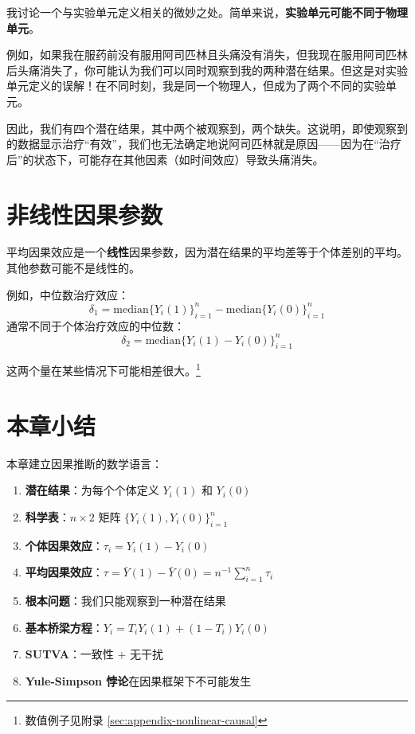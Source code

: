 我讨论一个与实验单元定义相关的微妙之处。简单来说，\textbf{实验单元可能不同于物理单元}。

例如，如果我在服药前没有服用阿司匹林且头痛没有消失，但我现在服用阿司匹林后头痛消失了，你可能认为我们可以同时观察到我的两种潜在结果。但这是对实验单元定义的误解！在不同时刻，我是同一个物理人，但成为了两个不同的实验单元。

因此，我们有四个潜在结果，其中两个被观察到，两个缺失。这说明，即使观察到的数据显示治疗``有效''，我们也无法确定地说阿司匹林就是原因——因为在``治疗后''的状态下，可能存在其他因素（如时间效应）导致头痛消失。

\section{非线性因果参数}

平均因果效应是一个\textbf{线性}因果参数，因为潜在结果的平均差等于个体差别的平均。其他参数可能不是线性的。

例如，中位数治疗效应：
\[
\delta_1 = \text{median}\{ Y_i(1) \}_{i=1}^n - \text{median}\{ Y_i(0) \}_{i=1}^n
\tag{2.6}\label{eq:median-treatment-effect-1}
\]
通常不同于个体治疗效应的中位数：
\[
\delta_2 = \text{median}\{ Y_i(1) - Y_i(0) \}_{i=1}^n
\tag{2.7}\label{eq:median-treatment-effect-2}
\]

这两个量在某些情况下可能相差很大。\footnote{数值例子见附录 \cref{sec:appendix-nonlinear-causal}}

\section{本章小结}

本章建立因果推断的数学语言：

\begin{enumerate}
  \item \textbf{潜在结果}：为每个个体定义 $Y_i(1)$ 和 $Y_i(0)$
  \item \textbf{科学表}：$n \times 2$ 矩阵 $\{Y_i(1), Y_i(0)\}_{i=1}^n$
  \item \textbf{个体因果效应}：$\tau_i = Y_i(1) - Y_i(0)$
  \item \textbf{平均因果效应}：$\tau = \bar{Y}(1) - \bar{Y}(0) = n^{-1}\sum_{i=1}^n \tau_i$
  \item \textbf{根本问题}：我们只能观察到一种潜在结果
  \item \textbf{基本桥梁方程}：$Y_i = T_i Y_i(1) + (1-T_i) Y_i(0)$
  \item \textbf{SUTVA}：一致性 + 无干扰
  \item \textbf{Yule-Simpson 悖论}在因果框架下不可能发生
\end{enumerate}

